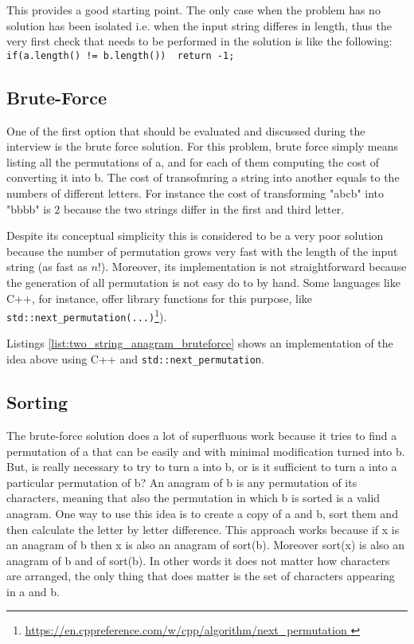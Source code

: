  This provides a good starting point. The only case when the problem has no solution has been isolated i.e. when the input string differes in length, thus the  very first check that needs to be performed in the solution is like the following: \lstinline[columns=fixed]{if(a.length() != b.length())  return -1;}



\subsection{Brute-Force}
One of the first option that should be evaluated and discussed during the interview is the brute force solution. For this problem, brute force simply means listing all the permutations of a, and for each of them computing the cost of converting it into b. The cost of transofmring a string into another equals to the numbers of different letters. For instance the cost of transforming "abcb" into "bbbb" is $2$ because the two strings differ in the first and third letter. 

Despite its conceptual simplicity this is considered to be a very poor solution because the number of permutation grows very fast with the length of the input string (as fast as $n!$).  Moreover, its implementation  is not straightforward because the generation of all permutation is not easy do to by hand. Some languages like C++, for instance, offer library functions for this purpose, like \lstinline[columns=fixed]{std::next_permutation(...)}\footnote{\url{https://en.cppreference.com/w/cpp/algorithm/next_permutation }}).  

Listings \ref{list:two_string_anagram_bruteforce} shows an implementation of the idea above using C++ and \lstinline[columns=fixed]{std::next_permutation}.





\subsection{Sorting}
The brute-force solution does a lot of superfluous work because it tries to find a permutation of a that can be easily and with minimal modification turned into b. But, is really necessary to try to turn a into b, or is it sufficient to turn a into a particular permutation of b? An anagram of b is any permutation of its characters, meaning that also the permutation in which b is sorted is a valid anagram. One way to use this idea is to create a copy of a and b, sort them and then calculate the letter by letter difference. This approach works because if x is an anagram of b then x is also an anagram of sort(b). Moreover sort(x) is also an anagram of b and of sort(b). In other words it does not matter how characters are arranged, the only thing that does matter is the set of characters appearing in a and b.

